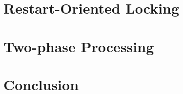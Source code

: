 \documentclass[sans]{beamer}
\begin{document}
\section{Restart-Oriented Locking}

\section{Two-phase Processing}

\section{Conclusion}
\end{document}
